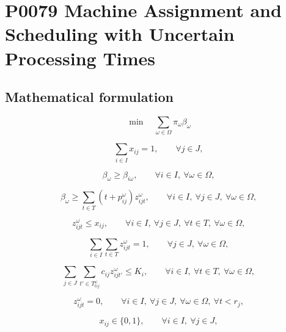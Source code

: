 \documentclass[10pt]{article}
\begin{document}
\section*{P0079 Machine Assignment and Scheduling with Uncertain Processing Times}
\subsection*{Mathematical formulation}
\begin{equation}
\min \quad \sum_{\omega \in \Omega} \pi_\omega \beta_\omega
\tag{M1}
\end{equation}

\begin{equation}
\sum_{i \in I} x_{ij} = 1,
\qquad \forall j \in J,
\tag{M2}
\end{equation}

\begin{equation}
\beta_\omega \ge \beta_{i\omega},
\qquad \forall i \in I,\ \forall \omega \in \Omega,
\tag{M3}
\end{equation}

\begin{equation}
\beta_\omega \ge \sum_{t \in T} (t + p_{ij}^{\omega}) z_{ijt}^{\omega},
\qquad \forall i \in I,\ \forall j \in J,\ \forall \omega \in \Omega,
\tag{M4}
\end{equation}

\begin{equation}
z_{ijt}^{\omega} \le x_{ij},
\qquad \forall i \in I,\ \forall j \in J,\ \forall t \in T,\ \forall \omega \in \Omega,
\tag{M5}
\end{equation}

\begin{equation}
\sum_{i \in I} \sum_{t \in T} z_{ijt}^{\omega} = 1,
\qquad \forall j \in J,\ \forall \omega \in \Omega,
\tag{M6}
\end{equation}

\begin{equation}
\sum_{j \in J} \sum_{t' \in T_{tij}^{\omega}} c_{ij} z_{ijt'}^{\omega} \le K_i,
\qquad \forall i \in I,\ \forall t \in T,\ \forall \omega \in \Omega,
\tag{M7}
\end{equation}

\begin{equation}
z_{ijt}^{\omega} = 0,
\qquad \forall i \in I,\ \forall j \in J,\ \forall \omega \in \Omega,\ \forall t<r_j,
\tag{M8}
\end{equation}

\begin{equation}
x_{ij} \in \{0,1\},
\qquad \forall i \in I,\ \forall j \in J,
\tag{M9}
\end{equation}
\end{document}
